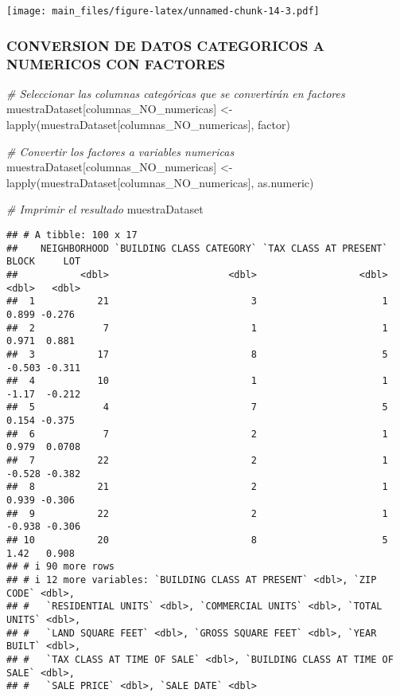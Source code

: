\documentclass[
]{article}
\newenvironment{Shaded}{\begin{snugshade}}{\end{snugshade}}
\newcommand{\CommentTok}[1]{\textcolor[rgb]{0.56,0.35,0.01}{\textit{#1}}}
\newcommand{\FunctionTok}[1]{\textcolor[rgb]{0.00,0.00,0.00}{#1}}
\newcommand{\NormalTok}[1]{#1}
\newcommand{\OtherTok}[1]{\textcolor[rgb]{0.56,0.35,0.01}{#1}}
\begin{document}
\texttt{[image: main\_files/figure-latex/unnamed-chunk-14-3.pdf]}

\hypertarget{conversion-de-datos-categoricos-a-numericos-con-factores}{%
\subsubsection{CONVERSION DE DATOS CATEGORICOS A NUMERICOS CON
FACTORES}\label{conversion-de-datos-categoricos-a-numericos-con-factores}}

\begin{Shaded}
\begin{Highlighting}[]
\CommentTok{\# Seleccionar las columnas categóricas que se convertirán en factores}
\NormalTok{muestraDataset[columnas\_NO\_numericas] }\OtherTok{\textless{}{-}} \FunctionTok{lapply}\NormalTok{(muestraDataset[columnas\_NO\_numericas], factor)}

\CommentTok{\# Convertir los factores a variables numericas}
\NormalTok{muestraDataset[columnas\_NO\_numericas] }\OtherTok{\textless{}{-}} \FunctionTok{lapply}\NormalTok{(muestraDataset[columnas\_NO\_numericas], as.numeric)}

\CommentTok{\# Imprimir el resultado}
\NormalTok{muestraDataset}
\end{Highlighting}
\end{Shaded}

\begin{verbatim}
## # A tibble: 100 x 17
##    NEIGHBORHOOD `BUILDING CLASS CATEGORY` `TAX CLASS AT PRESENT`  BLOCK     LOT
##           <dbl>                     <dbl>                  <dbl>  <dbl>   <dbl>
##  1           21                         3                      1  0.899 -0.276 
##  2            7                         1                      1  0.971  0.881 
##  3           17                         8                      5 -0.503 -0.311 
##  4           10                         1                      1 -1.17  -0.212 
##  5            4                         7                      5  0.154 -0.375 
##  6            7                         2                      1  0.979  0.0708
##  7           22                         2                      1 -0.528 -0.382 
##  8           21                         2                      1  0.939 -0.306 
##  9           22                         2                      1 -0.938 -0.306 
## 10           20                         8                      5  1.42   0.908 
## # i 90 more rows
## # i 12 more variables: `BUILDING CLASS AT PRESENT` <dbl>, `ZIP CODE` <dbl>,
## #   `RESIDENTIAL UNITS` <dbl>, `COMMERCIAL UNITS` <dbl>, `TOTAL UNITS` <dbl>,
## #   `LAND SQUARE FEET` <dbl>, `GROSS SQUARE FEET` <dbl>, `YEAR BUILT` <dbl>,
## #   `TAX CLASS AT TIME OF SALE` <dbl>, `BUILDING CLASS AT TIME OF SALE` <dbl>,
## #   `SALE PRICE` <dbl>, `SALE DATE` <dbl>
\end{verbatim}
\end{document}

